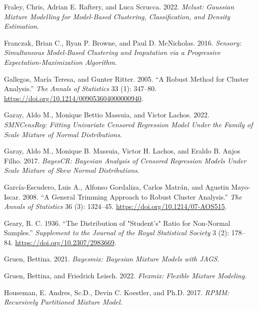 \begin{CSLReferences}{1}{0}
\leavevmode{}%
Fraley, Chris, Adrian E. Raftery, and Luca Scrucca. 2022. \emph{Mclust: Gaussian Mixture Modelling for Model-Based Clustering, Classification, and Density Estimation}.

\leavevmode{}%
Franczak, Brian C., Ryan P. Browne, and Paul D. McNicholas. 2016. \emph{Sensory: Simultaneous Model-Based Clustering and Imputation via a Progressive Expectation-Maximization Algorithm}.

\leavevmode{}%
Gallegos, María Teresa, and Gunter Ritter. 2005. {``A Robust Method for Cluster Analysis.''} \emph{The Annals of Statistics} 33 (1): 347--80. \url{https://doi.org/10.1214/009053604000000940}.

\leavevmode{}%
Garay, Aldo M., Monique Bettio Massuia, and Victor Lachos. 2022. \emph{SMNCensReg: Fitting Univariate Censored Regression Model Under the Family of Scale Mixture of Normal Distributions}.

\leavevmode{}%
Garay, Aldo M., Monique B. Massuia, Victor H. Lachos, and Eraldo B. Anjos Filho. 2017. \emph{BayesCR: Bayesian Analysis of Censored Regression Models Under Scale Mixture of Skew Normal Distributions}.

\leavevmode{}%
García-Escudero, Luis A., Alfonso Gordaliza, Carlos Matrán, and Agustin Mayo-Iscar. 2008. {``A General Trimming Approach to Robust Cluster Analysis.''} \emph{The Annals of Statistics} 36 (3): 1324--45. \url{https://doi.org/10.1214/07-AOS515}.

\leavevmode{}%
Geary, R. C. 1936. {``The {Distribution} of "{Student}'s" {Ratio} for {Non-Normal Samples}.''} \emph{Supplement to the Journal of the Royal Statistical Society} 3 (2): 178--84. \url{https://doi.org/10.2307/2983669}.

\leavevmode{}%
Gruen, Bettina. 2021. \emph{Bayesmix: Bayesian Mixture Models with JAGS}.

\leavevmode{}%
Gruen, Bettina, and Friedrich Leisch. 2022. \emph{Flexmix: Flexible Mixture Modeling}.

\leavevmode{}%
Houseman, E. Andres, Sc.D., Devin C. Koestler, and Ph.D. 2017. \emph{RPMM: Recursively Partitioned Mixture Model}.


\end{CSLReferences}
